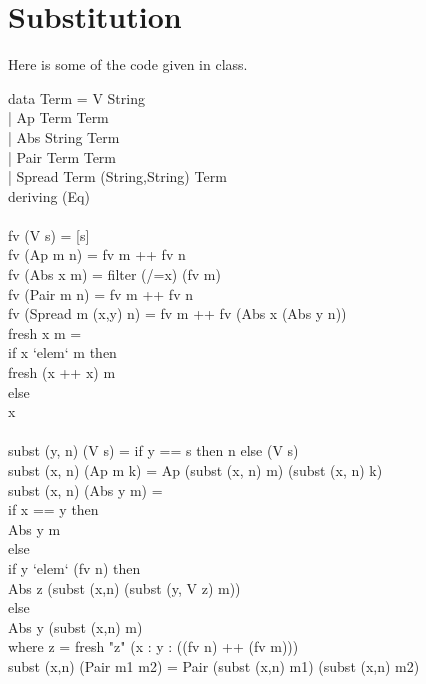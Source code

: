 \documentclass[11pt]{article}
\begin{document}

\section{Substitution}

Here is  some of the code given in class.

\begin{program*}
\>  data Term = V String  \\
\>           | Ap Term Term  \\
\>           | Abs String Term  \\
\>           | Pair Term Term \\
\>           | Spread Term (String,String) Term \\
\>    deriving (Eq) \\
\> \\
\>  fv (V s) = [s] \\
\>  fv (Ap m n) = fv m ++ fv n \\
\>  fv (Abs x m) =   filter (/=x) (fv m) \\
\>  fv (Pair m n) = fv m ++ fv n \\
\>  fv (Spread m (x,y) n) = fv m ++ fv (Abs x (Abs y n))
\> \\
\>  fresh x m =  \\
\>     if x `elem` m then \\
\>       fresh (x ++ x) m \\
\>     else \\
\>       x \\
\> \\
\>  subst (y, n) (V s) = if y == s then n else (V s) \\
\>  subst (x, n) (Ap m k) = Ap (subst (x, n) m) (subst (x, n) k) \\
\>  subst (x, n) (Abs y m) =  \\
\>      if x == y  then \\
\>         Abs y m \\
\>      else \\
\>         if y `elem` (fv n) then \\
\>            Abs z (subst (x,n) (subst (y, V z) m)) \\
\>         else \\
\>            Abs y (subst (x,n) m) \\
\>    where z = fresh "z" (x : y : ((fv n) ++ (fv m))) \\
\>  subst (x,n) (Pair m1 m2) = Pair (subst (x,n) m1) (subst (x,n) m2) \\

\end{program*}
\end{document}

